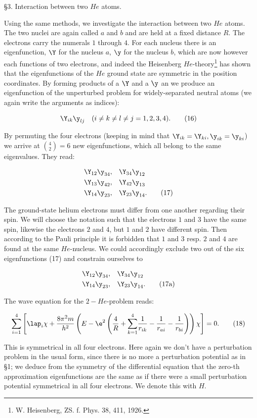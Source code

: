 \documentclass{article}
\newcommand{\nequ}[2]{
\begin{align*}
#1
\tag{#2}
\end{align*}
}
\newcommand{\sumXY}[2]{\underset{#1}{\overset{#2}{\sum}}}
\begin{document}
§3. Interaction between two $He$ atoms.

Using the same methods, we investigate the interaction between two $He$ atoms. The two nuclei are again called $a$ and $b$ and are held at a fixed distance $R$. The electrons carry the numerals $1$ through $4$. For each nucleus there is an eigenfunction, $\Y$ for the nucleus $a$, $\y$ for the nucleus $b$, which are now however each functions of two electrons, and indeed the Heisenberg $He$-theory\footnote{W. Heisenberg, ZS. f. Phys. 38, 411, 1926.} has shown that the eigenfunctions of the $He$ ground state are symmetric in the position coordinates. By forming products of a $\Y$ and a $\y$ an we produce an eigenfunction of the unperturbed problem for widely-separated neutral atoms (we again write the arguments as indices):
\nequ{
\Y_{ik}\y_{lj}\quad (i \neq k \neq l \neq j = 1,2,3,4).
}{16}
By permuting the four electrons (keeping in mind that $\Y_{ik} = \Y_{ki}, \y_{ik} = \y_{ki}$) we arrive at $\binom{4}{2} = 6$ new eigenfunctions, which all belong to the same eigenvalues. They read:
\nequ{
\Y_{12}\y_{34}, &\quad \Y_{34}\y_{12} \\
\Y_{13}\y_{42}, &\quad \Y_{42}\y_{13} \\
\Y_{14}\y_{23}, &\quad \Y_{23}\y_{14}.
}{17}
The ground-state helium electrons must differ from one another regarding their spin. We will choose the notation such that the electrons $1$ and $3$ have the same spin, likewise the electrons $2$ and $4$, but $1$ and $2$ have different spin. Then according to the Pauli principle it is forbidden that $1$ and $3$ resp. $2$ and $4$ are found at the same $He$-nucleus. We could accordingly exclude two out of the six eigenfunctions (17) and constrain ourselves to
\nequ{
\Y_{12}\y_{34}, &\quad \Y_{34}\y_{12} \\
\Y_{14}\y_{23}, &\quad \Y_{23}\y_{14}.
}{17a}
The wave equation for the $2-He$-problem reads:
\nequ{
\sumXY{i=1}{4}\left[\lap_i \chi + \frac{8\pi^2 m}{h^2}\left(E - \e^2 \left(
\frac{4}{R} + \sumXY{k=1}{4}\frac{1}{r_{ik}} - \frac{1}{r_{ai}} - \frac{1}{r_{bi}}
\right)\right)\chi \right] = 0.
}{18}

This is symmetrical in all four electrons. Here again we don't have a perturbation problem in the usual form, since there is no more a perturbation potential as in §1; we deduce from the symmetry of the differential equation that the zero-th approximation eigenfunctions are the same as if there were a small perturbation potential symmetrical in all four electrons. We denote this with $H$.
\end{document}
